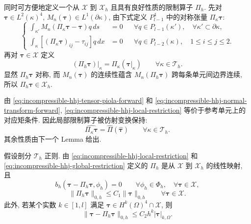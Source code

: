 同时可方便地定义一个从 $\mathcal X$ 到 $\mathcal X_h$
且具有良好性质的限制算子 $\Pi_h$.
先对 $\boldsymbol\tau\in L^2(\kappa)^4$,
$M_n(\boldsymbol\tau)\in L^1(\partial\kappa)$,
由下式定义 $P_{l-1}^4$ 中的对称张量
$\Pi_\kappa\boldsymbol\tau$:
\begin{equation}\label{eq:incompressible-hhj-local-restriction}
\left\{
\begin{aligned}
\int_{\kappa'}M_n(\Pi_\kappa\boldsymbol\tau
-\boldsymbol\tau)q\,ds&=0
&&\forall q\in P_{l-1}(\kappa'),
\quad\forall\kappa'\subset\partial\kappa,\\
\int_\kappa[(\Pi_\kappa\boldsymbol\tau)_{ij}-\tau_{ij}]q\,dx&=0
&&\forall q\in P_{l-2}(\kappa),
\quad1\leq i\leq j\leq2.
\end{aligned}
\right.
\end{equation}
再对 $\boldsymbol\tau\in\mathcal X$ 定义
\begin{equation}\label{eq:incompressible-hhj-global-restriction}
(\Pi_h\boldsymbol\tau)|_\kappa
=\Pi_\kappa(\boldsymbol\tau|_\kappa)
\qquad\forall\kappa\in\mathcal T_h.
\end{equation}
显然 $\Pi_h\boldsymbol\tau$ 对称,
而 $M_n(\boldsymbol\tau)$ 的连续性蕴含
$M_n(\Pi_h\boldsymbol\tau)$ 跨每条单元间边界连续,
所以 $\Pi_h\boldsymbol\tau\in\mathcal X_h$.

由 \eqref{eq:incompressible-hhj-tensor-piola-forward}
和 \eqref{eq:incompressible-hhj-normal-transform-forward},
\eqref{eq:incompressible-hhj-local-restriction}
等价于参考单元上的对应矩条件.
因此局部限制算子被仿射变换保持:
\begin{equation}\label{eq:incompressible-hhj-restriction-affine-commuting}
\widehat{\Pi_\kappa\boldsymbol\tau}
=\widehat\Pi(\widehat{\boldsymbol\tau})
\qquad\forall\kappa\in\mathcal T_h.
\end{equation}
其余性质由下一个 Lemma 给出.

\begin{Lemma}\label{lem:incompressible-hhj-restriction-properties}
假设剖分 $\mathcal T_h$ 正则.
由 \eqref{eq:incompressible-hhj-local-restriction}
和 \eqref{eq:incompressible-hhj-global-restriction}
定义的 $\Pi_h$ 是从 $\mathcal X$ 到 $\mathcal X_h$ 的线性映射, 且
\begin{equation}\label{eq:incompressible-hhj-restriction-orthogonality}
b_h(\boldsymbol\tau-\Pi_h\boldsymbol\tau,\phi_h)=0
\qquad\forall\phi_h\in\Phi_h,
\quad\forall\boldsymbol\tau\in\mathcal X,
\end{equation}
\begin{equation}\label{eq:incompressible-hhj-restriction-stability}
\|\Pi_h\boldsymbol\tau\|_{0,h}
\leq C_1\|\boldsymbol\tau\|_{0,h}
\qquad\forall\boldsymbol\tau\in\mathcal X.
\end{equation}
此外, 若某个实数 $k\in[1,l]$ 满足
$\boldsymbol\tau\in H^k(\Omega)^4\cap\mathcal X$, 则
\begin{equation}\label{eq:incompressible-hhj-restriction-error}
\|\boldsymbol\tau-\Pi_h\boldsymbol\tau\|_{0,h}
\leq C_2h^k|\boldsymbol\tau|_{k,\Omega}.
\end{equation}
\end{Lemma}

